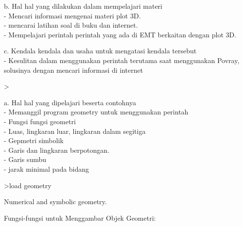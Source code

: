 \documentclass[a4paper,10pt]{article}
\begin{document}
\begin{eulernotebook}
\begin{eulercomment}
\begin{eulercomment}
\begin{eulercomment}
\begin{eulercomment}
\begin{eulercomment}
\begin{eulercomment}
\begin{eulercomment}
\begin{eulercomment}
\begin{eulercomment}
b. Hal hal yang dilakukan dalam mempelajari materi\\
- Mencari informasi mengenai materi plot 3D.\\
- mencarai latihan soal di buku dan internet.\\
- Mempelajari perintah perintah yang ada di EMT berkaitan dengan plot
3D.

c. Kendala kendala dan usaha untuk mengatasi kendala tersebut\\
- Kesulitan dalam menggunakan perintah terutama saat menggunakan
Povray, solusinya dengan mencari informasi di internet\\
\end{eulercomment}
\eulersubheading{}
\begin{eulerprompt}
> 
\end{eulerprompt}
\begin{eulercomment}
\end{eulercomment}
\begin{eulercomment}
a. Hal hal yang dipelajari beserta contohnya\\
- Memanggil program geometry untuk menggunakan perintah\\
- Fungsi fungsi geometri\\
- Luas, lingkaran luar, lingkaran dalam segitiga\\
- Gepmetri simbolik\\
- Garis dan lingkaran berpotongan.\\
- Garis sumbu\\
- jarak minimal pada bidang
\end{eulercomment}
\begin{eulerprompt}
>load geometry
\end{eulerprompt}
\begin{euleroutput}
  Numerical and symbolic geometry.
\end{euleroutput}
\begin{eulercomment}
Fungsi-fungsi untuk Menggambar Objek Geometri:


\end{eulercomment}
\end{eulercomment}
\end{eulercomment}
\end{eulercomment}
\end{eulercomment}
\end{eulercomment}
\end{eulercomment}
\end{eulercomment}
\end{eulercomment}
\end{eulernotebook}
\end{document}
